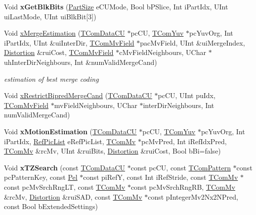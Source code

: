 \begin{DoxyCompactItemize}
Void {\bfseries x\+Get\+Blk\+Bits} (\hyperlink{_type_def_8h_a0093b7809f3cfae06fda9d67441267bd}{Part\+Size} e\+C\+U\+Mode, Bool b\+P\+Slice, Int i\+Part\+Idx, U\+Int ui\+Last\+Mode, U\+Int ui\+Blk\+Bit\mbox{[}3\mbox{]})
\item 
\mbox{\label{class_t_enc_search_a2f8bbacb7f1610c8954c316e980c00a6}} 
Void \hyperlink{class_t_enc_search_a2f8bbacb7f1610c8954c316e980c00a6}{x\+Merge\+Estimation} (\hyperlink{class_t_com_data_c_u}{T\+Com\+Data\+CU} $\ast$pc\+CU, \hyperlink{class_t_com_yuv}{T\+Com\+Yuv} $\ast$pc\+Yuv\+Org, Int i\+Part\+Idx, U\+Int \&ui\+Inter\+Dir, \hyperlink{class_t_com_mv_field}{T\+Com\+Mv\+Field} $\ast$pac\+Mv\+Field, U\+Int \&ui\+Merge\+Index, \hyperlink{_type_def_8h_aed82b23ef6849d0bc3d95c92102d5b50}{Distortion} \&rui\+Cost, \hyperlink{class_t_com_mv_field}{T\+Com\+Mv\+Field} $\ast$c\+Mv\+Field\+Neighbours, U\+Char $\ast$uh\+Inter\+Dir\+Neighbours, Int \&num\+Valid\+Merge\+Cand)
\begin{DoxyCompactList}\small\item\em estimation of best merge coding \end{DoxyCompactList}\item 
Void \hyperlink{class_t_enc_search_a05aee80be3bc090cfb755630520379b9}{x\+Restrict\+Bipred\+Merge\+Cand} (\hyperlink{class_t_com_data_c_u}{T\+Com\+Data\+CU} $\ast$pc\+CU, U\+Int pu\+Idx, \hyperlink{class_t_com_mv_field}{T\+Com\+Mv\+Field} $\ast$mv\+Field\+Neighbours, U\+Char $\ast$inter\+Dir\+Neighbours, Int num\+Valid\+Merge\+Cand)
\item 
\mbox{\label{class_t_enc_search_a3fa1f98d0e7f63439d030225098106c6}} 
Void {\bfseries x\+Motion\+Estimation} (\hyperlink{class_t_com_data_c_u}{T\+Com\+Data\+CU} $\ast$pc\+CU, \hyperlink{class_t_com_yuv}{T\+Com\+Yuv} $\ast$pc\+Yuv\+Org, Int i\+Part\+Idx, \hyperlink{_type_def_8h_a93cea48eb9dcfd661168dee82e41b384}{Ref\+Pic\+List} e\+Ref\+Pic\+List, \hyperlink{class_t_com_mv}{T\+Com\+Mv} $\ast$pc\+Mv\+Pred, Int i\+Ref\+Idx\+Pred, \hyperlink{class_t_com_mv}{T\+Com\+Mv} \&rc\+Mv, U\+Int \&rui\+Bits, \hyperlink{_type_def_8h_aed82b23ef6849d0bc3d95c92102d5b50}{Distortion} \&rui\+Cost, Bool b\+Bi=false)
\item 
\mbox{\label{class_t_enc_search_ad4707216c3f5e7afa431257c442a2136}} 
Void {\bfseries x\+T\+Z\+Search} (const \hyperlink{class_t_com_data_c_u}{T\+Com\+Data\+CU} $\ast$const pc\+CU, const \hyperlink{class_t_com_pattern}{T\+Com\+Pattern} $\ast$const pc\+Pattern\+Key, const \hyperlink{_type_def_8h_af92141699657699b4b547be0c8517541}{Pel} $\ast$const pi\+RefY, const Int i\+Ref\+Stride, const \hyperlink{class_t_com_mv}{T\+Com\+Mv} $\ast$const pc\+Mv\+Srch\+Rng\+LT, const \hyperlink{class_t_com_mv}{T\+Com\+Mv} $\ast$const pc\+Mv\+Srch\+Rng\+RB, \hyperlink{class_t_com_mv}{T\+Com\+Mv} \&rc\+Mv, \hyperlink{_type_def_8h_aed82b23ef6849d0bc3d95c92102d5b50}{Distortion} \&rui\+S\+AD, const \hyperlink{class_t_com_mv}{T\+Com\+Mv} $\ast$const p\+Integer\+Mv2\+Nx2\+N\+Pred, const Bool b\+Extended\+Settings)

\end{DoxyCompactItemize}
